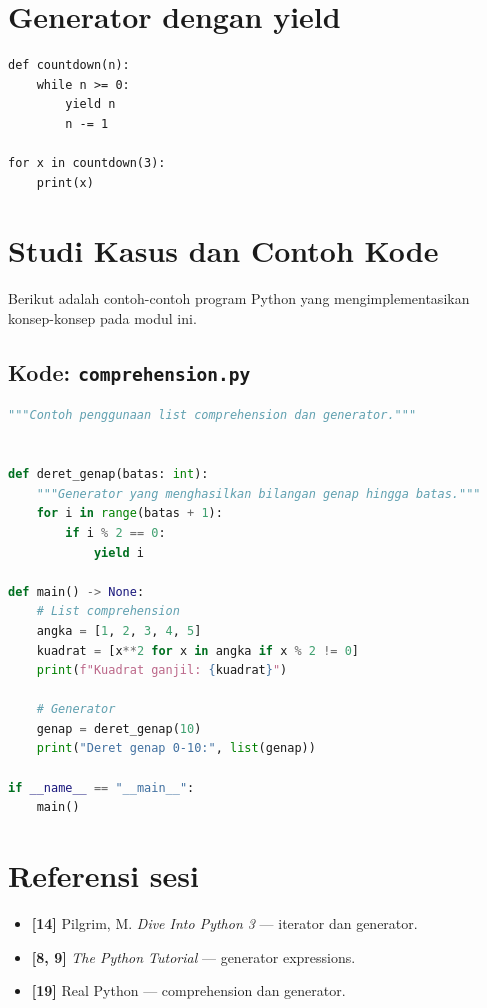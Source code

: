 \documentclass[../main.tex]{subfiles}
\begin{document}
\section{Generator dengan yield}

\begin{lstlisting}[caption=Generator sederhana]
def countdown(n):
    while n >= 0:
        yield n
        n -= 1

for x in countdown(3):
    print(x)
\end{lstlisting}

\section{Studi Kasus dan Contoh Kode}

Berikut adalah contoh-contoh program Python yang mengimplementasikan konsep-konsep pada modul ini.

\subsection{Kode: \texttt{comprehension.py}}
\begin{lstlisting}[language=Python,caption={\texttt{comprehension.py}}]
"""Contoh penggunaan list comprehension dan generator."""


def deret_genap(batas: int):
    """Generator yang menghasilkan bilangan genap hingga batas."""
    for i in range(batas + 1):
        if i % 2 == 0:
            yield i

def main() -> None:
    # List comprehension
    angka = [1, 2, 3, 4, 5]
    kuadrat = [x**2 for x in angka if x % 2 != 0]
    print(f"Kuadrat ganjil: {kuadrat}")
    
    # Generator
    genap = deret_genap(10)
    print("Deret genap 0-10:", list(genap))

if __name__ == "__main__":
    main()
\end{lstlisting}

\section{Referensi sesi}

\begin{itemize}[leftmargin=*]
  \item \textbf{[14]} Pilgrim, M. \textit{Dive Into Python 3} --- iterator dan generator.
  \item \textbf{[8, 9]} \textit{The Python Tutorial} --- generator expressions.
  \item \textbf{[19]} Real Python --- comprehension dan generator.
\end{itemize}
\end{document}
